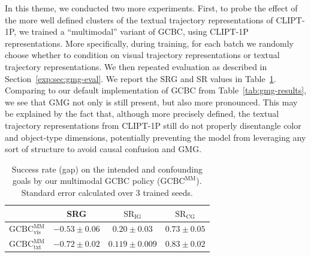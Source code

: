 \documentclass[../main.tex]{subfiles}
\begin{document}
In this theme, we conducted two more experiments. First, to probe the effect of the more well
defined clusters of the textual trajectory representations of CLIPT-1P, we trained a ``multimodal''
variant of GCBC, using CLIPT-1P representations. More specifically, during training, for each batch
we randomly choose whether to condition on visual trajectory representations or textual trajectory
representations. We then repeated evaluation as described in Section~\ref{exp:sec:gmg-eval}. We
report the SRG and SR values in Table~\ref{tab:gmg-multimodal-results}. Comparing to our default
implementation of GCBC from Table~\ref{tab:gmg-results}, we see that GMG not only is still present,
but also more pronounced. This may be explained by the fact that, although more precisely defined,
the textual trajectory representations from CLIPT-1P still do not properly disentangle color and
object-type dimensions, potentially preventing the model from leveraging any sort of structure to
avoid causal confusion and GMG.

\begin{table}[tb]
	\centering
	\caption[Success rate on the intended and confounding goals (multimodal)]{Success rate (gap) on
		the intended and confounding goals by our multimodal GCBC policy ($\text{GCBC}^\text{MM}$).
		Standard error calculated over
		3 trained seeds.}
	\label{tab:gmg-multimodal-results}
	\begin{tabular}{@{}rccc@{}}
		\toprule
		                                            & \textbf{SRG}     & \textbf{$\text{SR}_\text{IG}$} & \textbf{$\text{SR}_\text{CG}$} \\ \midrule
		\textbf{$\text{GCBC}_\text{vis}^\text{MM}$} & $-0.53 \pm 0.06$ & $0.20 \pm 0.03$                & $0.73 \pm 0.05$                \\
		\textbf{$\text{GCBC}_\text{txt}^\text{MM}$} & $-0.72 \pm 0.02$ & $0.119 \pm 0.009$              & $0.83 \pm 0.02$                \\ \bottomrule
	\end{tabular}
\end{table}
\end{document}
